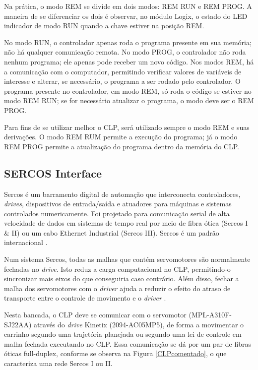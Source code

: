 Na prática, o modo REM se divide em dois modos: REM RUN e REM PROG. A maneira de se diferenciar os dois é observar, no módulo Logix, o estado do LED indicador de modo RUN quando a chave estiver na posição REM.

No modo RUN, o controlador apenas roda o programa presente em sua memória; não há qualquer comunicação remota. No modo PROG, o controlador não roda nenhum programa; ele apenas pode receber um novo código. Nos modos REM, há a comunicação com o computador, permitindo verificar valores de variáveis de interesse e alterar, se necessário, o programa a ser rodado pelo controlador. O programa presente no controlador, em modo REM, só roda o código se estiver no modo REM RUN; se for necessário atualizar o programa, o modo deve ser o REM PROG.

Para fins de se utilizar melhor o CLP, será utilizado sempre o modo REM e suas derivações. O modo REM RUM permite a execução do programa; já o modo REM PROG permite a atualização do programa dentro da memória do CLP.
\subsection{SERCOS Interface}

Sercos é um barramento digital de automação que interconecta controladores, \textit{drives}, dispositivos de entrada/saída e atuadores para máquinas e sistemas controlados numericamente. Foi projetado para comunicação serial de alta velocidade de dados em sistemas de tempo real por meio de fibra ótica (Sercos I \& II) ou um cabo Ethernet Industrial (Sercos III). Sercos é um padrão internacional \cite{sercos}.

Num sistema Sercos, todas as malhas que contém servomotores são normalmente fechadas no \textit{drive}. Isto reduz a carga computacional no CLP, permitindo-o sincronizar mais eixos do que conseguiria caso contrário. Além disso, fechar a malha dos servomotores com o \textit{driver} ajuda a reduzir o efeito do atraso de transporte entre o controle de movimento e o \textit{driver} \cite{sercos}.

Nesta bancada, o CLP deve se comunicar com o servomotor (MPL-A310F-SJ22AA) através do \textit{drive} Kinetix (2094-AC05MP5), de forma a movimentar o carrinho segundo uma trajetória planejada ou segundo uma lei de controle em malha fechada executando no CLP. Essa comunicação se dá por um par de fibras óticas full-duplex, conforme se observa na Figura \ref{CLPcomentado}, o que caracteriza uma rede Sercos I ou II.

